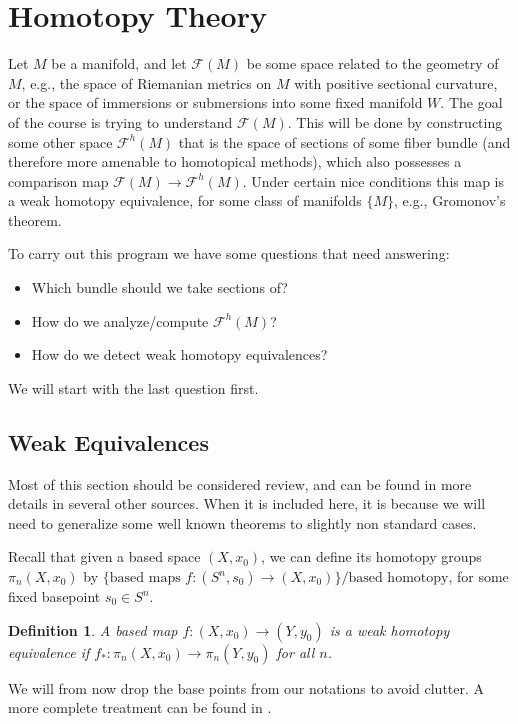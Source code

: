 \documentclass{article}
\newtheorem{definition}[theorem]{Definition}
\newtheorem{proposed work}[theorem]{Proposed Work}
\begin{document}
\section{Homotopy Theory}
Let $M$ be a manifold, and let $\mathcal{F}(M)$ be some space related to the geometry of $M$, e.g., the space of Riemanian metrics on $M$ with positive sectional curvature, or the space of immersions or submersions into some fixed manifold $W$. The goal of the course is trying to understand $\mathcal{F}(M)$. This will be done by constructing some other space $\mathcal{F}^h(M)$ that is the space of sections of some fiber bundle (and therefore more amenable to homotopical methods), which also possesses a comparison map $\mathcal{F}(M)\to \mathcal{F}^h(M)$. Under certain nice conditions this map is a weak homotopy equivalence, for some class of manifolds $\{M\}$, e.g., Gromonov's theorem.

To carry out this program we have some questions that need answering:
\begin{itemize}
\item Which bundle should we take sections of?
\item How do we analyze/compute $\mathcal{F}^h(M)$?
\item How do we detect weak homotopy equivalences? 
\end{itemize} 
We will start with the last question first.

\subsection{Weak Equivalences}
Most of this section should be considered review, and can be found in more details in several other sources. When it is included here, it is because we will need to generalize some well known theorems to slightly non standard cases.

Recall that given a based space $(X,x_0)$, we can define its homotopy groups $\pi_n(X,x_0)$ by $\{\text{based maps }f:(S^n,s_0)\to (X,x_0)\}/\text{based homotopy}$, for some fixed basepoint $s_0\in S^n$. 
\begin{definition}
A based map $f:(X,x_0)\to (Y,y_0)$ is a weak homotopy equivalence if $f_*:\pi_n(X,x_0)\to \pi_n(Y,y_0)$ for all $n$.
\end{definition}
We will from now drop the base points from our notations to avoid clutter. A more complete treatment can be found in \cite{may1999concise}.
\end{document}
